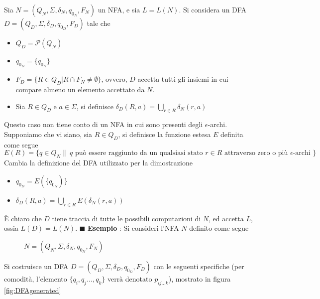 \documentclass[10pt, letterpaper]{report}
\begin{document}
Sia $N=(Q_N,\Sigma,\delta_N,q_{0_N},F_N)$ un NFA, e sia $L=L(N)$. Si considera un DFA 
$D=(Q_D,\Sigma,\delta_D,q_{0_D},F_D)$ tale che \begin{itemize}
    \item $Q_D=\mathcal{P}(Q_N)$
    \item $q_{0_D}=\{q_{0_N}\}$
    \item $F_D=\{R\in Q_D | R\cap F_N\ne \emptyset\}$, ovvero, $D$ accetta tutti gli insiemi in cui compare almeno 
    un elemento accettato da $N$.
    \item Sia $R\in Q_D$ e $a\in\Sigma$, si definisce $\displaystyle\delta_D(R,a)=\bigcup_{r\in R}\delta_N(r,a)$
\end{itemize}
Questo caso non tiene conto di un NFA in cui sono presenti degli $\epsilon$-archi. Supponiamo che vi siano,  sia 
$R\in Q_D$, si definisce la funzione estesa $E$ definita come segue 
$$ E(R)=\{q\in Q_N \|\ q\text{ può essere raggiunto da un qualsiasi stato  }r\in R\text{ attraverso zero o 
più }\epsilon\text{-archi }\}$$
Cambia la definizione del DFA utilizzato per la dimostrazione \begin{itemize}
    \item $q_{0_D}=E(\{q_{0_N})\}$
    \item $\displaystyle\delta_D(R,a)=\bigcup_{r\in R}E(\delta_N(r,a))$
\end{itemize}
È chiaro che $D$ tiene traccia di tutte le possibili computazioni di $N$, ed accetta $L$, ossia $L(D)=L(N)$. $\blacksquare$\acc 
\textbf{Esempio} : Si consideri l'NFA $N$ definito come segue
\begin{figure}[h!]
    \centering
    \caption{$N=(Q_N,\Sigma,\delta_N,q_{0_N},F_N)$}
    \label{fig:NFAExample2}
\end{figure}\acc
Si costruisce un DFA $D=(Q_D,\Sigma,\delta_D,q_{0_D},F_D)$ con le seguenti specifiche (per comodità, l'elemento $\{q_i,q_j\dots,q_k\}$ verrà 
denotato $p_{ij\dots k}$), mostrato in figura \ref{fig:DFAgenerated}
\end{document}
